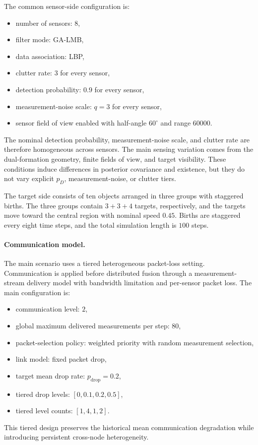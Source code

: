 The common sensor-side configuration is:
\begin{itemize}
\item number of sensors: $8$,
\item filter mode: GA-LMB,
\item data association: LBP,
\item clutter rate: $3$ for every sensor,
\item detection probability: $0.9$ for every sensor,
\item measurement-noise scale: $q = 3$ for every sensor,
\item sensor field of view enabled with half-angle $60^\circ$ and range $60000$.
\end{itemize}
The nominal detection probability, measurement-noise scale, and clutter rate are therefore homogeneous across sensors. The main sensing variation comes from the dual-formation geometry, finite fields of view, and target visibility. These conditions induce differences in posterior covariance and existence, but they do not vary explicit $p_D$, measurement-noise, or clutter tiers.

The target side consists of ten objects arranged in three groups with staggered births. The three groups contain $3 + 3 + 4$ targets, respectively, and the targets move toward the central region with nominal speed $0.45$. Births are staggered every eight time steps, and the total simulation length is $100$ steps.

\paragraph{Communication model.}

The main scenario uses a tiered heterogeneous packet-loss setting. Communication is applied before distributed fusion through a measurement-stream delivery model with bandwidth limitation and per-sensor packet loss. The main configuration is:
\begin{itemize}
\item communication level: $2$,
\item global maximum delivered measurements per step: $80$,
\item packet-selection policy: weighted priority with random measurement selection,
\item link model: fixed packet drop,
\item target mean drop rate: $p_{\mathrm{drop}} = 0.2$,
\item tiered drop levels: $[0, 0.1, 0.2, 0.5]$,
\item tiered level counts: $[1, 4, 1, 2]$.
\end{itemize}
This tiered design preserves the historical mean communication degradation while introducing persistent cross-node heterogeneity.


